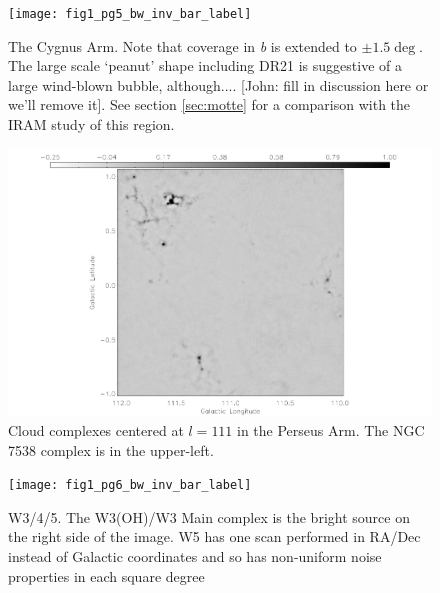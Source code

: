 \documentclass[12pt,preprint]{aastex}
\newcommand{\lon}{\ensuremath{l}}
\begin{document}
\begin{figure}
  \hspace{-1in}
  \texttt{[image: fig1\_pg5\_bw\_inv\_bar\_label]} 
  \caption{The Cygnus Arm. Note that coverage in \emph{b} is extended to $\pm
  1.5\deg$. The large scale `peanut' shape including DR21 is suggestive of a
  large wind-blown bubble, although.... [John: fill in discussion here or we'll
  remove it].  See section \ref{sec:motte} for a comparison with the
  \citet{motte07} IRAM study of this region. }
\end{figure}

\addtocounter{figure}{-1}
\addtocounter{subfig}{1}

\begin{figure}
\hspace{-0.5in}
  \includegraphics[scale=0.8]{fig1_pg4_bw_inv_bar_label} 
  \caption{Cloud complexes centered at $\lon=111$ in the Perseus Arm. 
  The NGC 7538 complex is in the upper-left.}
\end{figure}

\addtocounter{figure}{-1}
\addtocounter{subfig}{1}

\begin{figure}
  \hspace{-1in}
  \texttt{[image: fig1\_pg6\_bw\_inv\_bar\_label]} 
  \caption{W3/4/5.  The W3(OH)/W3 Main complex is the bright source
  on the right side of the image.  W5 has one scan performed in RA/Dec
  instead of Galactic coordinates and so has non-uniform noise properties
  in each square degree}
\end{figure}

\renewcommand{\thefigure}{\arabic{figure}}
\end{document}
